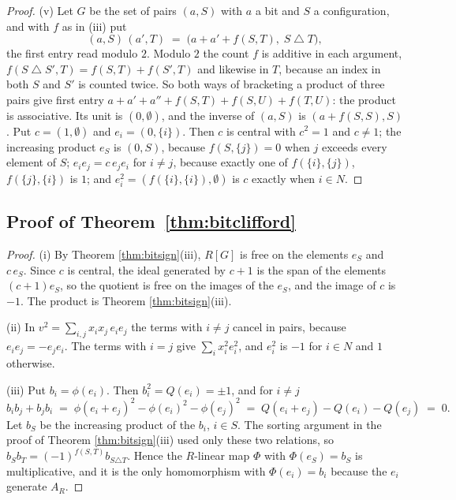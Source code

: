 \documentclass[11pt]{article}
\theoremstyle{plain}
\theoremstyle{definition}
\theoremstyle{plain}
\theoremstyle{definition}
\begin{document}
\begin{proof}
(v) Let $G$ be the set of pairs $(a, S)$ with $a$ a bit and $S$ a configuration, and with $f$ as in (iii) put
\[
(a, S)\,(a', T) \;=\; \bigl(a + a' + f(S,T),\; S \mathbin{\triangle} T\bigr),
\]
the first entry read modulo $2$. Modulo $2$ the count $f$ is additive in each argument, $f(S \mathbin{\triangle} S', T) = f(S,T) + f(S',T)$ and likewise in $T$, because an index in both $S$ and $S'$ is counted twice. So both ways of bracketing a product of three pairs give first entry $a + a' + a'' + f(S,T) + f(S,U) + f(T,U)$: the product is associative. Its unit is $(0, \emptyset)$, and the inverse of $(a,S)$ is $(a + f(S,S), S)$. Put $c = (1, \emptyset)$ and $e_{i} = (0, \{i\})$. Then $c$ is central with $c^{2} = 1$ and $c \neq 1$; the increasing product $e_{S}$ is $(0, S)$, because $f(S, \{j\}) = 0$ when $j$ exceeds every element of $S$; $e_{i}e_{j} = c\,e_{j}e_{i}$ for $i \neq j$, because exactly one of $f(\{i\},\{j\})$, $f(\{j\},\{i\})$ is $1$; and $e_{i}^{2} = (f(\{i\},\{i\}), \emptyset)$ is $c$ exactly when $i \in N$.
\end{proof}

\subsection{\texorpdfstring{Proof of Theorem~\ref{thm:bitclifford}}{Proof of Theorem 4.1}}\label{prf:thm:bitclifford}

\begin{proof}
(i) By Theorem \ref{thm:bitsign}(iii), $R[G]$ is free on the elements $e_{S}$ and $c\,e_{S}$. Since $c$ is central, the ideal generated by $c + 1$ is the span of the elements $(c+1)e_{S}$, so the quotient is free on the images of the $e_{S}$, and the image of $c$ is $-1$. The product is Theorem \ref{thm:bitsign}(iii).

(ii) In $v^{2} = \sum_{i,j} x_{i}x_{j}\,e_{i}e_{j}$ the terms with $i \neq j$ cancel in pairs, because $e_{i}e_{j} = -e_{j}e_{i}$. The terms with $i = j$ give $\sum_{i} x_{i}^{2}e_{i}^{2}$, and $e_{i}^{2}$ is $-1$ for $i \in N$ and $1$ otherwise.

(iii) Put $b_{i} = \phi(e_{i})$. Then $b_{i}^{2} = Q(e_{i}) = \pm 1$, and for $i \neq j$
\[
b_{i}b_{j} + b_{j}b_{i} \;=\; \phi(e_{i} + e_{j})^{2} - \phi(e_{i})^{2} - \phi(e_{j})^{2} \;=\; Q(e_{i} + e_{j}) - Q(e_{i}) - Q(e_{j}) \;=\; 0 .
\]
Let $b_{S}$ be the increasing product of the $b_{i}$, $i \in S$. The sorting argument in the proof of Theorem \ref{thm:bitsign}(iii) used only these two relations, so $b_{S}b_{T} = (-1)^{f(S,T)}b_{S \triangle T}$. Hence the $R$-linear map $\Phi$ with $\Phi(e_{S}) = b_{S}$ is multiplicative, and it is the only homomorphism with $\Phi(e_{i}) = b_{i}$ because the $e_{i}$ generate $A_{R}$.
\end{proof}
\end{document}
